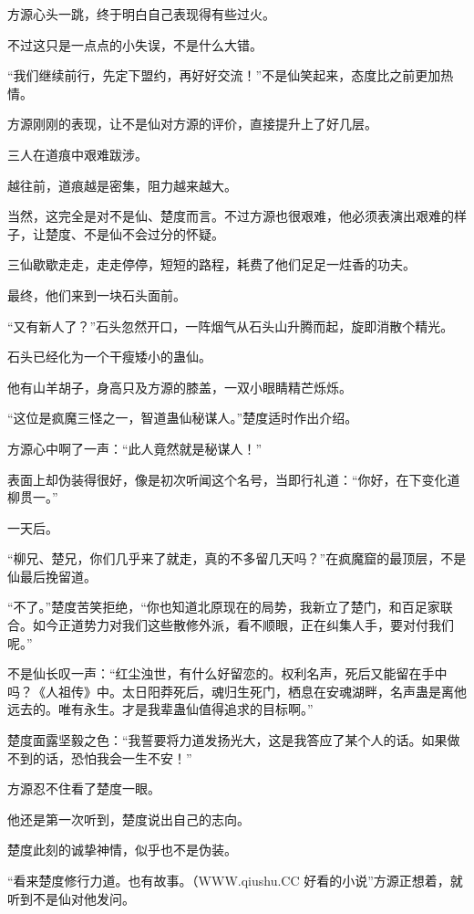 
\begin{this_body}

方源心头一跳，终于明白自己表现得有些过火。

不过这只是一点点的小失误，不是什么大错。

“我们继续前行，先定下盟约，再好好交流！”不是仙笑起来，态度比之前更加热情。

方源刚刚的表现，让不是仙对方源的评价，直接提升上了好几层。

三人在道痕中艰难跋涉。

越往前，道痕越是密集，阻力越来越大。

当然，这完全是对不是仙、楚度而言。不过方源也很艰难，他必须表演出艰难的样子，让楚度、不是仙不会过分的怀疑。

三仙歇歇走走，走走停停，短短的路程，耗费了他们足足一炷香的功夫。

最终，他们来到一块石头面前。

“又有新人了？”石头忽然开口，一阵烟气从石头山升腾而起，旋即消散个精光。

石头已经化为一个干瘦矮小的蛊仙。

他有山羊胡子，身高只及方源的膝盖，一双小眼睛精芒烁烁。

“这位是疯魔三怪之一，智道蛊仙秘谋人。”楚度适时作出介绍。

方源心中啊了一声：“此人竟然就是秘谋人！”

表面上却伪装得很好，像是初次听闻这个名号，当即行礼道：“你好，在下变化道柳贯一。”

一天后。

“柳兄、楚兄，你们几乎来了就走，真的不多留几天吗？”在疯魔窟的最顶层，不是仙最后挽留道。

“不了。”楚度苦笑拒绝，“你也知道北原现在的局势，我新立了楚门，和百足家联合。如今正道势力对我们这些散修外派，看不顺眼，正在纠集人手，要对付我们呢。”

不是仙长叹一声：“红尘浊世，有什么好留恋的。权利名声，死后又能留在手中吗？《人祖传》中。太日阳莽死后，魂归生死门，栖息在安魂湖畔，名声蛊是离他远去的。唯有永生。才是我辈蛊仙值得追求的目标啊。”

楚度面露坚毅之色：“我誓要将力道发扬光大，这是我答应了某个人的话。如果做不到的话，恐怕我会一生不安！”

方源忍不住看了楚度一眼。

他还是第一次听到，楚度说出自己的志向。

楚度此刻的诚挚神情，似乎也不是伪装。

“看来楚度修行力道。也有故事。（WWW.qiushu.CC 好看的小说”方源正想着，就听到不是仙对他发问。


\end{this_body}
